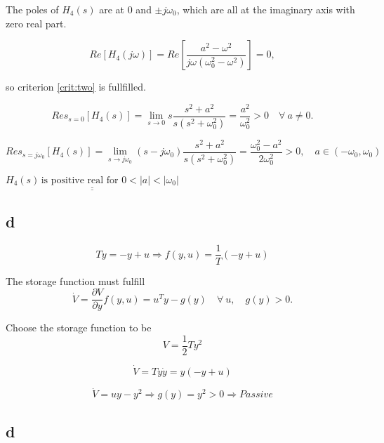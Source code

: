 \documentclass{article}
\begin{document}
The poles of $H_4(s)$ are at $0$ and $\pm j\omega_0$, which are all at the imaginary axis with zero real part. 

\begin{equation*}
    Re[H_4(j\omega)] = Re[\frac{a^2 - \omega^2}{j\omega(\omega_0^2 - \omega^2)}] = 0,
\end{equation*}

so criterion \ref{crit:two} is fullfilled. 

\begin{equation*}
    Res_{s = 0}[H_4(s)] = \lim_{s \to 0} s \frac{s^2 + a^2}{s(s^2 + \omega_0^2)} = \frac{a^2}{\omega_0^2} > 0 \quad \forall \: a \neq 0.
\end{equation*}

\begin{equation*}
    Res_{s = j\omega_0}[H_4(s)] = \lim_{s \to j\omega_0} (s-j\omega_0) \frac{s^2 + a^2}{s(s^2 + \omega_0^2)} = \frac{\omega_0^2 - a^2}{2\omega_0^2} > 0, \quad a \in (-\omega_0,\omega_0)
\end{equation*}

$\underline{\underline{H_4(s) \, \textrm{is positive real for } 0 < |a| < |\omega_0|}}$

\subsection*{d}

\begin{equation*}
    T\dot y = -y + u \Rightarrow f(y,u) = \frac{1}{T}(-y + u)
\end{equation*}

The storage function must fulfill 
\begin{equation*}
    \dot V = \frac{\partial V}{\partial y}f(y,u) = u^Ty - g(y) \quad \forall \: u, \quad g(y) > 0.
\end{equation*}

Choose the storage function to be
\begin{equation*}
    V = \frac{1}{2}Ty^2
\end{equation*}

\begin{equation*}
    \dot V = Ty\dot y = y(-y + u)
\end{equation*}


\begin{equation*}
    \dot V = uy - y^2 \Rightarrow g(y) = y^2 > 0 \Rightarrow Passive
\end{equation*}

\subsection*{d}
\end{document}
